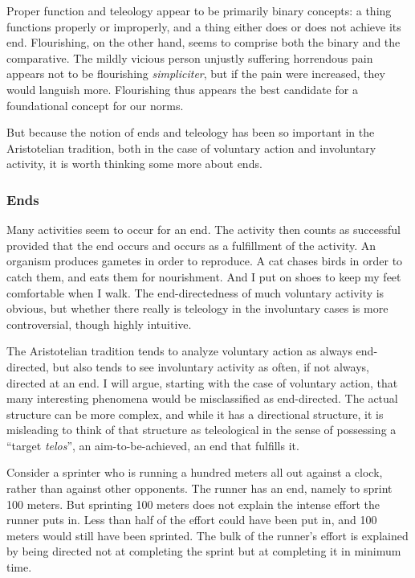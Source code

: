 Proper function and teleology appear to be primarily binary concepts: a thing functions properly or improperly, and a thing either 
does or does not achieve its end. Flourishing, on the other hand, seems to comprise both the binary and the comparative. The mildly
vicious person unjustly suffering horrendous pain appears not to be flourishing \textit{simpliciter}, but if the pain were increased,
they would languish more. Flourishing thus appears the best candidate for a foundational concept for our norms.

But because the notion of ends and teleology has been so important in the Aristotelian tradition, both in the case of voluntary 
action and involuntary activity, it is worth thinking some more about ends.

\subsubsection{Ends}
Many activities seem to occur for an end. The activity then counts as successful provided that the end occurs and occurs as a
fulfillment of the activity. An organism produces gametes in order to reproduce. A cat chases birds in order to catch them,
and eats them for nourishment. And I put on shoes to keep my feet comfortable when I walk. The end-directedness of much voluntary
activity is obvious, but whether there really is teleology in the involuntary cases is more controversial, though highly intuitive.

The Aristotelian tradition tends to analyze voluntary action as always end-directed, but also tends to see involuntary activity as 
often, if not always, directed at an end. I will argue, starting with the case of voluntary action, that many interesting phenomena 
would be misclassified as end-directed. The actual structure can be more complex, and while it has a directional structure, it is
misleading to think of that structure as teleological in the sense of possessing a ``target \textit{telos}'', an aim-to-be-achieved,
an end that fulfills it.

Consider a sprinter who is running a hundred meters all out against a clock, rather than against other opponents. The runner has an end, 
namely to sprint 100 meters. But sprinting 100 meters does not explain the intense effort the runner puts in. Less than half of the effort 
could have been put in, and 100 meters would still have been sprinted. The bulk of the runner's effort is explained by being directed 
not at completing the sprint but at completing it in minimum time.

